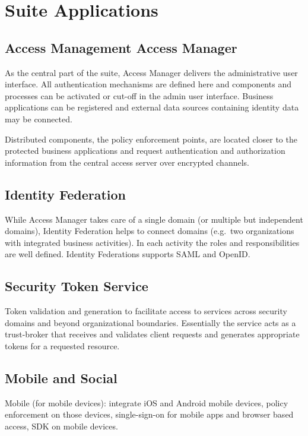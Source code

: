 \documentclass[11pt]{report}
\begin{document}
\section{Suite Applications}


\subsection{Access Management Access Manager}

As the central part of the suite, Access Manager delivers the
administrative user interface. All authentication mechanisms are defined
here and components and processes can be activated or cut-off in the
admin user interface. Business applications can be registered and
external data sources containing identity data may be connected.

Distributed components, the policy enforcement points, are located
closer to the protected business applications and request authentication
and authorization information from the central access server over
encrypted channels.


\subsection{Identity Federation}

While Access Manager takes care of a single domain (or multiple but
independent domains), Identity Federation helps to connect domains
(e.g.\ two organizations with integrated business activities).  In each
activity the roles and responsibilities are well defined. Identity
Federations supports SAML and OpenID\@.


\subsection{Security Token Service}

Token validation and generation to facilitate access to services across
security domains and beyond organizational boundaries. Essentially the
service acts as a trust-broker that receives and validates client
requests and generates appropriate tokens for a requested resource.


\subsection{Mobile and Social}

Mobile (for mobile devices): integrate iOS and Android mobile devices,
policy enforcement on those devices, single-sign-on for mobile apps and
browser based access, SDK on mobile devices.
\end{document}
